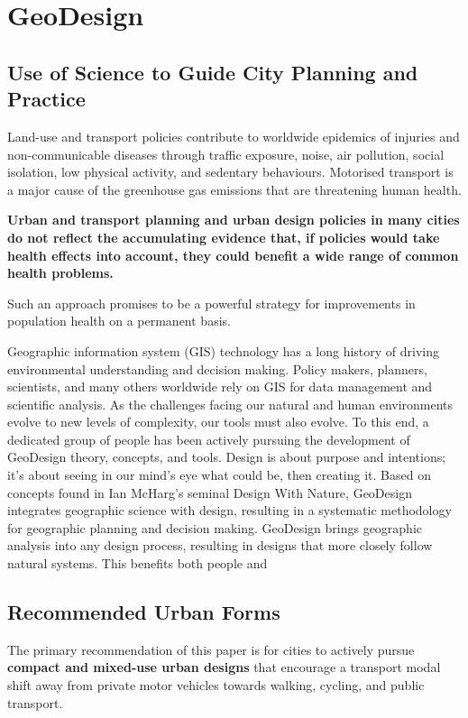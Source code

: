 \documentclass[12pt]{caltech_thesis}
\begin{document}
\chapter{GeoDesign}
\begin{bibunit}

\section{Use of Science to Guide City Planning and Practice}
\citep{Sallis2016}
Land-use and transport policies contribute to worldwide epidemics of injuries and non-communicable diseases through traffic exposure, noise, air pollution, social isolation, low physical activity, and sedentary behaviours. Motorised transport is a major cause of the greenhouse gas emissions that are threatening human health. 

\textbf{Urban and transport planning and urban design policies in many cities do not reflect the accumulating evidence that, if policies would take health effects into account, they could benefit a wide range of common health problems.} \citep{Sallis2016}



Such an approach promises to be a powerful strategy for improvements in population health on a permanent basis.\citep{Sallis2016}






\citep{Readings2010}
Geographic information system (GIS) technology has a long history of driving environmental understanding and decision making. Policy makers, planners, scientists, and many others worldwide rely on GIS for data management and scientific analysis. As the challenges facing our natural and human environments evolve to new levels of complexity, our tools must also evolve. To this end, a dedicated group of people has been actively pursuing the development of GeoDesign theory, concepts, and tools. Design is about purpose and intentions; it's about seeing in our mind's eye what could be, then creating it. Based on concepts found in Ian McHarg's seminal Design With Nature, GeoDesign integrates geographic science with design, resulting in a systematic methodology for geographic planning and decision making. GeoDesign brings geographic analysis into any design process, resulting in designs that more closely follow natural systems. This benefits both people and 


\section{Recommended Urban Forms}
The primary recommendation of this paper is for cities to actively pursue \textbf{compact and mixed-use urban designs} that encourage a transport modal shift away from private motor vehicles towards walking, cycling, and public transport. \citep{Sallis2016}



\renewcommand{\bibsection}{\section*{\refname}}
\putbib[ownpubs]  %
\end{bibunit}
\end{document}
